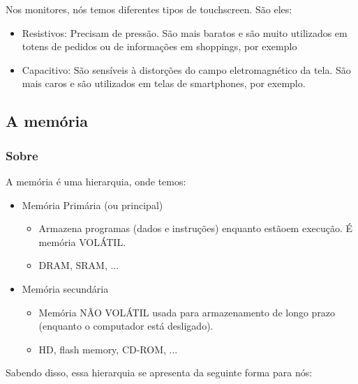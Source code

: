 \documentclass[12pt,a4paper]{report}
\begin{document}
	Nos monitores, nós temos diferentes tipos de touchscreen. São eles:
	
	\begin{itemize}
		\item Resistivos: Precisam de pressão. São mais baratos e são muito utilizados em totens de pedidos ou de informações em shoppings, por exemplo
		\item Capacitivo: São sensíveis à distorções do campo eletromagnético da tela. São mais caros e são utilizados em telas de smartphones, por exemplo.
	\end{itemize}
	
	
	\subsection{A memória}
	\subsubsection{Sobre}
	A memória é uma hierarquia, onde temos:
	
	\begin{itemize}
		\item Memória Primária (ou principal)
		\begin{itemize}
			\item Armazena programas (dados e instruções) enquanto estãoem execução. É memória VOLÁTIL.
			\item DRAM, SRAM, ...
		\end{itemize}
		\item Memória secundária
		\begin{itemize}
			\item Memória NÃO VOLÁTIL usada para armazenamento de longo prazo (enquanto o computador está desligado).
			\item HD, flash memory, CD-ROM, ...
		\end{itemize}
	\end{itemize}
	
	Sabendo disso, essa hierarquia se apresenta da seguinte forma para nós:
	
\end{document}
